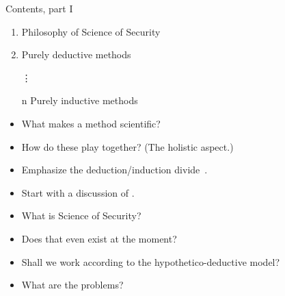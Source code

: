 \begin{frame}
  \begin{block}{Contents, part I}
    \begin{enumerate}
      \item Philosophy of Science of Security
      \item Purely deductive methods
      \item[\vdots]
      \item[n] Purely inductive methods
    \end{enumerate}
  \end{block}

  \pause

  \begin{remark}
    \begin{itemize}
      \item What makes a method scientific?
      \item How do these play together? (The holistic aspect.)
      \item Emphasize the deduction/induction divide~\cite{SecurityAsAScience}.
    \end{itemize}
  \end{remark}
\end{frame}

\begin{frame}
  \begin{example}
    \begin{itemize}
      \item Start with a discussion of 
        .
      \item What is Science of Security?
      \item Does that even exist at the moment?
      \item Shall we work according to the hypothetico-deductive model?
      \item What are the problems?
    \end{itemize}
  \end{example}
\end{frame}

